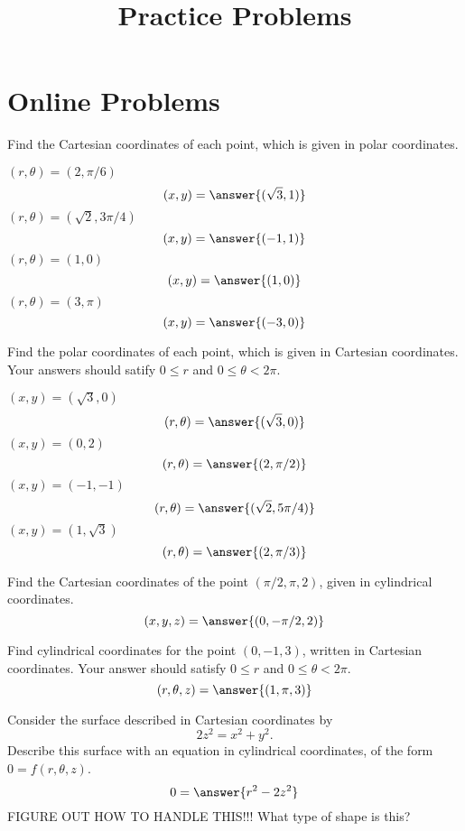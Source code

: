\documentclass{ximera}
\title{Practice Problems}
\begin{document}
\begin{abstract}
\end{abstract}
\maketitle
\section{Online Problems}
\begin{problem}
Find the Cartesian coordinates of each point, which is given in polar coordinates.

$(r,\theta) = (2, \pi/6)$
\[
(x,y) = \answer{(\sqrt{3},1)}
\]
$(r,\theta) = (\sqrt{2}, 3\pi/4)$
\[
(x,y) = \answer{(-1,1)}
\]
$(r,\theta) = (1, 0)$
\[
(x,y) = \answer{(1,0)}
\]
$(r,\theta) = (3, \pi)$
\[
(x,y) = \answer{(-3,0)}
\]
\end{problem}

\begin{problem}
Find the polar coordinates of each point, which is given in Cartesian coordinates. Your answers should satify $0\leq r$ and $0\leq \theta < 2\pi$.

$(x,y) = (\sqrt{3},0)$
\[
(r,\theta) = \answer{(\sqrt{3},0)}
\]
$(x,y) = (0,2)$
\[
(r,\theta) = \answer{(2,\pi/2)}
\]
$(x,y) = (-1,-1)$
\[
(r,\theta) = \answer{(\sqrt{2},5\pi/4)}
\]
$(x,y) = (1,\sqrt{3})$
\[
(r,\theta) = \answer{(2,\pi/3)}
\]
\end{problem}

\begin{problem}
Find the Cartesian coordinates of the point $(\pi/2, \pi, 2)$, given in cylindrical coordinates.
\[
(x,y,z) = \answer{(0, -\pi/2, 2)}
\]
\end{problem}

\begin{problem}
Find cylindrical coordinates for the point $\left(0, -1, 3\right)$, written in Cartesian coordinates. Your answer should satisfy $0\leq r$ and $0\leq \theta <2\pi$.
\[
(r, \theta, z) = \answer{(1, \pi, 3)}
\]
\end{problem}

\begin{problem}
Consider the surface described in Cartesian coordinates by
\[
2z^2 = x^2 +y^2.
\]
Describe this surface with an equation in cylindrical coordinates, of the form $0=f(r,\theta, z)$.
\[
0=\answer{r^2-2z^2}
\]
FIGURE OUT HOW TO HANDLE THIS!!!
What type of shape is this?
\begin{multipleChoice}
\end{multipleChoice}
\end{problem}
\end{document}

